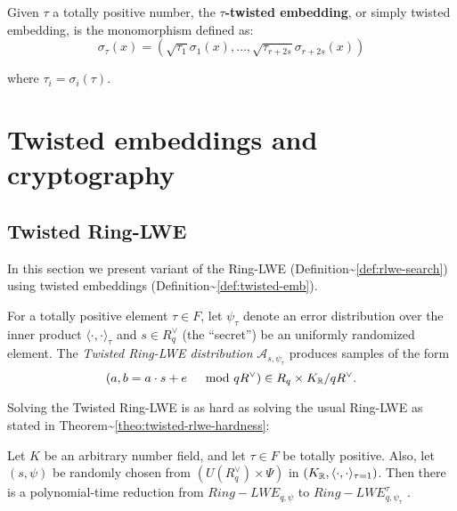 \documentclass[a4paper,12pt]{article}
\begin{document}
\begin{definition}
  \label{def:twisted-emb}
  Given $\tau$ a totally positive number, the \textbf{$\tau$-twisted embedding}, or
  simply twisted embedding, is the monomorphism defined as:
  \begin{equation*}
    \sigma_\tau(x) = \left( \sqrt{\tau_1}\sigma_1(x), \dots, \sqrt{\tau_{r+2s}}\sigma_{r+2s}(x) \right)
  \end{equation*}

  where $\tau_i = \sigma_i(\tau)$.
\end{definition}
\section{Twisted embeddings and cryptography}
\label{sec:org02d0130}
\subsection{Twisted Ring-LWE}
\label{sec:orgb495212}
In this section we present variant of the Ring-LWE (Definition\textasciitilde{}\ref{def:rlwe-search}) using twisted embeddings (Definition\textasciitilde{}\ref{def:twisted-emb}).



\begin{definition}
  \label{def:twisted-ring-lwe}
  For a totally positive element $\tau \in F$, let $\psi_\tau$ denote an error distribution
  over the inner product $\langle{\cdot,\cdot}\rangle_\tau$ and $s \in R^\vee_q$ (the “secret”) be an
  uniformly randomized element. The \emph{Twisted Ring-LWE distribution}
  $\mathcal{A}_{s,\psi_\tau}$ produces samples of the form
  $$
  (a, b = a \cdot s + e \;\;\; \mod{qR^\vee}) \in R_q \times K_{\mathbb{R}}/qR^\vee.
  $$
\end{definition}

Solving the Twisted Ring-LWE is as hard as solving the usual Ring-LWE as stated in Theorem\textasciitilde{}\ref{theo:twisted-rlwe-hardness}:

\begin{theorem}
  \label{theo:twisted-rlwe-hardness}
  Let $K$ be an arbitrary number field, and let $\tau \in F$ be totally positive.
  Also, let $(s,\psi)$ be randomly chosen from $(U(R_q^\vee)\times \Psi)$ in $(K_{\mathbb{R}},\langle{\cdot,\cdot}\rangle_{\tau=1})$.
  Then there is a polynomial-time reduction from $Ring-LWE_{q,\psi}$ to $Ring-LWE^\tau_{q,\psi_\tau}$ .
\end{theorem}
\end{document}
